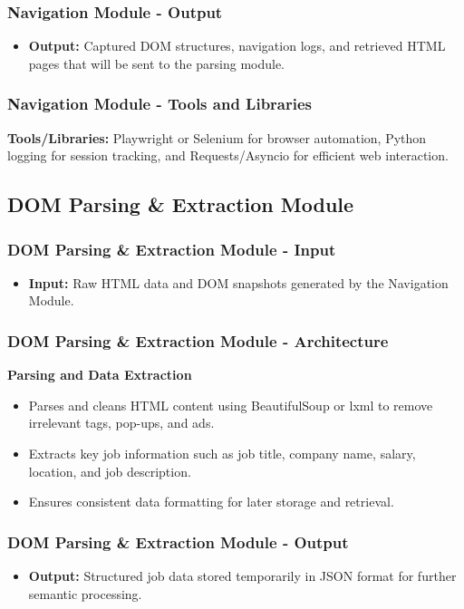 \documentclass{beamer}
\begin{document}
\begin{frame}
\frametitle{Navigation Module - Output}
\begin{itemize}
    \item \textbf{Output:} Captured DOM structures, navigation logs, and retrieved HTML pages that will be sent to the parsing module.
\end{itemize}
\end{frame}

\begin{frame}
\frametitle{Navigation Module - Tools and Libraries}
\textbf{Tools/Libraries:} Playwright or Selenium for browser automation, Python logging for session tracking, and Requests/Asyncio for efficient web interaction.
\end{frame}

\subsection{DOM Parsing \& Extraction Module}

\begin{frame}
\frametitle{DOM Parsing \& Extraction Module - Input}
\begin{itemize}
    \item \textbf{Input:} Raw HTML data and DOM snapshots generated by the Navigation Module.
\end{itemize}
\end{frame}

\begin{frame}
\frametitle{DOM Parsing \& Extraction Module - Architecture}
\textbf{Parsing and Data Extraction}
\begin{itemize}
    \item Parses and cleans HTML content using BeautifulSoup or lxml to remove irrelevant tags, pop-ups, and ads.
    \item Extracts key job information such as job title, company name, salary, location, and job description.
    \item Ensures consistent data formatting for later storage and retrieval.
\end{itemize}
\end{frame}

\begin{frame}
\frametitle{DOM Parsing \& Extraction Module - Output}
\begin{itemize}
    \item \textbf{Output:} Structured job data stored temporarily in JSON format for further semantic processing.
\end{itemize}
\end{frame}
\end{document}
